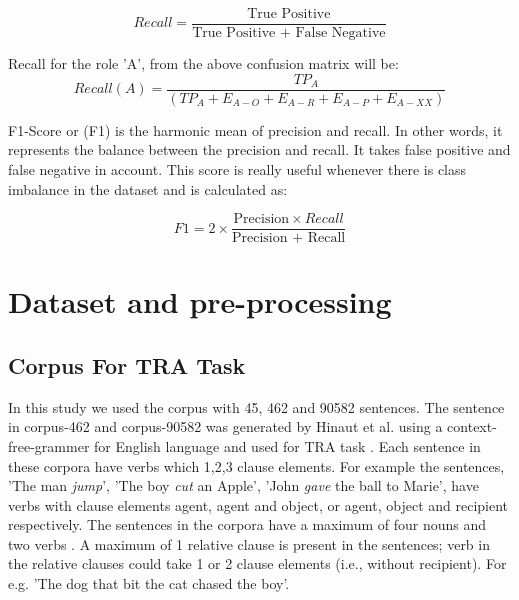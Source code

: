 \begin{equation}\label{eqn:recall}
Recall = \frac{\text{True Positive}}{\text{True Positive + False Negative}}
\end{equation}

Recall for the role 'A', from the above confusion matrix will be:
\[Recall(A) = \frac{TP_{A}}{(TP_{A}+E_{A-O}+E_{A-R}+E_{A-P}+E_{A-XX})}\]

\noindent F1-Score or (F1) is the harmonic mean of precision and recall. In other words, it represents the balance between the precision and recall. It takes false positive and false negative in account. This score is really useful whenever there is class imbalance in the dataset \cite{classification_scores:2009} and is calculated as:

\begin{equation}\label{eqn:precision}
F1 = 2\times \frac{\text{Precision} \times{Recall }}{\text{Precision + Recall}}
\end{equation}

\newpage

\section{Dataset and pre-processing}\label{datasets}

\subsection{Corpus For TRA Task}

In this study we used the corpus with 45, 462 and 90582 sentences. The sentence in corpus-462 and corpus-90582 was generated by Hinaut et al. using a context-free-grammer for English language and used for TRA task \cite{xavier:2013:RT}. Each sentence in these corpora have verbs which 1,2,3 clause elements. For example the sentences, 'The man \textit{jump}', 'The boy \textit{cut} an Apple', 'John \textit{gave} the ball to Marie', have verbs with clause elements agent, agent and object, or agent, object and recipient respectively. The sentences in the corpora have a maximum of four nouns and two verbs \cite{xavier:2013:RT}. A maximum of 1 relative clause is present in the sentences; verb in the relative clauses could take 1 or 2 clause elements (i.e., without recipient). For e.g. 'The dog that bit the cat chased the boy'. 

